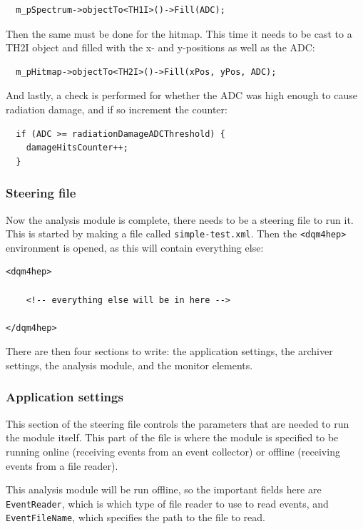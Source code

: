 \begin{lstlisting}
  m_pSpectrum->objectTo<TH1I>()->Fill(ADC);
\end{lstlisting}

Then the same must be done for the hitmap. This time it needs to be cast to a TH2I object and filled with the x- and y-positions as well as the \acrshort{ADC}:

\begin{lstlisting}
  m_pHitmap->objectTo<TH2I>()->Fill(xPos, yPos, ADC);
\end{lstlisting}

And lastly, a check is performed for whether the \acrshort{ADC} was high enough to cause radiation damage, and if so increment the counter:

\begin{lstlisting}
  if (ADC >= radiationDamageADCThreshold) {
    damageHitsCounter++;
  }
\end{lstlisting}

\subsubsection{Steering file}
Now the analysis module is complete, there needs to be a steering file to run it. This is started by making a file called \texttt{simple-test.xml}. Then the \texttt{<dqm4hep>} environment is opened, as this will contain everything else:

\begin{lstlisting}
<dqm4hep>

    <!-- everything else will be in here -->

</dqm4hep>
\end{lstlisting}

There are then four sections to write: the application settings, the archiver settings, the analysis module, and the monitor elements.

\subsubsection{Application settings}
This section of the steering file controls the parameters that are needed to run the module itself. This part of the file is where the module is specified to be running online (receiving events from an event collector) or offline (receiving events from a file reader).

This analysis module will be run offline, so the important fields here are \texttt{EventReader}, which is which type of file reader to use to read events, and \texttt{EventFileName}, which specifies the path to the file to read.

